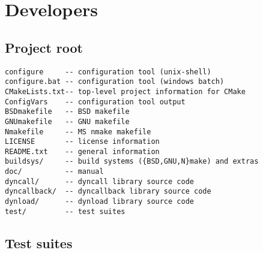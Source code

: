 %
%
%
%

\newpage
\section{Developers}

\subsection{Project root}
\begin{verbatim}
configure     -- configuration tool (unix-shell)
configure.bat -- configuration tool (windows batch)
CMakeLists.txt-- top-level project information for CMake
ConfigVars    -- configuration tool output
BSDmakefile   -- BSD makefile
GNUmakefile   -- GNU makefile
Nmakefile     -- MS nmake makefile
LICENSE       -- license information
README.txt    -- general information
buildsys/     -- build systems ({BSD,GNU,N}make) and extras
doc/          -- manual
dyncall/      -- dyncall library source code
dyncallback/  -- dyncallback library source code
dynload/      -- dynload library source code
test/         -- test suites
\end{verbatim}

\subsection{Test suites}

